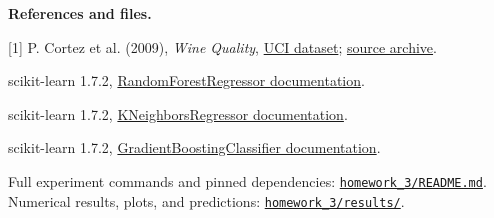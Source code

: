 \documentclass[10pt,letterpaper]{article}
\begin{document}
\vspace{3pt}
\textbf{References and files.}\\[-2pt]
{\small
[1] P. Cortez et al. (2009), \emph{Wine Quality}, \href{https://archive.ics.uci.edu/dataset/186/wine+quality}{UCI dataset}; \href{https://archive.ics.uci.edu/static/public/186/wine+quality.zip}{source archive}.\par
[2] scikit-learn 1.7.2, \href{https://scikit-learn.org/1.7/modules/generated/sklearn.ensemble.RandomForestRegressor.html}{RandomForestRegressor documentation}.\par
[3] scikit-learn 1.7.2, \href{https://scikit-learn.org/1.7/modules/generated/sklearn.neighbors.KNeighborsRegressor.html}{KNeighborsRegressor documentation}.\par
[4] scikit-learn 1.7.2, \href{https://scikit-learn.org/1.7/modules/generated/sklearn.ensemble.GradientBoostingClassifier.html}{GradientBoostingClassifier documentation}.\par
Full experiment commands and pinned dependencies: \href{https://github.com/richard0525/foundations-machine-learning-ai/blob/main/homework_3/README.md}{\texttt{homework\_3/README.md}}. Numerical results, plots, and predictions: \href{https://github.com/richard0525/foundations-machine-learning-ai/tree/main/homework_3/results}{\texttt{homework\_3/results/}}.
}
\end{document}
